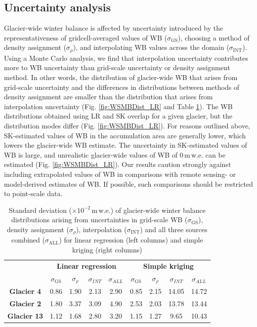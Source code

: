 \documentclass[review,oneside, letterpaper]{igs} %
\begin{document}
\subsection{Uncertainty analysis}

Glacier-wide winter balance is affected by uncertainty introduced by the representativeness of gridcell-averaged values of WB ($\sigma_{\mathrm{GS}}$), choosing a method of density assignment ($\sigma_{\rho}$), and interpolating WB values across the domain ($\sigma_{\mathrm{INT}}$). Using a Monte Carlo analysis, we find that interpolation uncertainty contributes more to WB uncertainty than grid-scale uncertainty or density assignment method. In other words, the distribution of glacier-wide WB that arises from grid-scale uncertainty and the differences in distributions between methods of density assignment are smaller than the distribution that arises from interpolation uncertainty (Fig. \ref{fig:WSMBDist_LR} and Table \ref{tab:WSMBdistribution_sigma}). The WB distributions obtained using LR and SK overlap for a given glacier, but the distribution modes differ (Fig. \ref{fig:WSMBDist_LR}). For reasons outlined above, SK-estimated values of WB in the accumulation area are generally lower, which lowers the glacier-wide WB estimate.  The uncertainty in SK-estimated values of WB is large, and unrealistic glacier-wide values of WB of 0\,m\,w.e. can be estimated (Fig. \ref{fig:WSMBDist_LR}). Our results caution strongly against including extrapolated values of WB in comparisons with remote sensing- or model-derived estimates of WB. If possible, such comparisons should be restricted to point-scale data. 

 \begin{table}[]
\centering
\caption{Standard deviation ($\times10^{-2}$\,m\,w.e.) of glacier-wide winter balance distributions arising from uncertainties in grid-scale WB ($\sigma_{\mathrm{GS}}$), density assignment ($\sigma_{\rho}$), interpolation ($\sigma_{\mathrm{INT}}$) and all three sources combined ($\sigma_{\mathrm{ALL}}$) for linear regression (left columns) and simple kriging (right columns)}
\label{tab:WSMBdistribution_sigma}
\begin{tabular}{c|cccc|cccc}
 & \multicolumn{4}{c|}{\textbf{Linear regression}} & \multicolumn{4}{c}{\textbf{Simple kriging}} \\
\textbf{} & $\sigma_{\mathrm{GS}}$ & $\sigma_{\rho}$ & $\sigma_{INT}$ & $\sigma_{ALL}$ & $\sigma_{\mathrm{GS}}$ & $\sigma_{\rho}$ & $\sigma_{INT}$ & $\sigma_{ALL}$ \\ \hline
\textbf{Glacier 4} & 0.86 & 1.90 & 2.13 & 2.90 & 0.85 & 2.15 & 14.05 & 14.72 \\
\textbf{Glacier 2} & 1.80 & 3.37 & 3.09 & 4.90 & 2.53 & 2.03 & 13.78 & 13.44 \\
\textbf{Glacier 13} & 1.12 & 1.68 & 2.80 & 3.20 & 1.15 & 1.27 & 9.65 & 10.43
\end{tabular}
\end{table}
\end{document}
